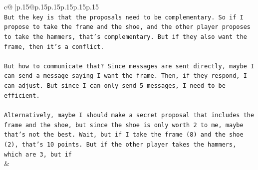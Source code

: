 \documentclass{article}
\begin{document}
{\begin{supertabular}{c@{$\;$}|p{.15\linewidth}@{}p{.15\linewidth}p{.15\linewidth}p{.15\linewidth}p{.15\linewidth}p{.15\linewidth}}
{{{\\ 
\texttt{But the key is that the proposals need to be complementary. So if I propose to take the frame and the shoe, and the other player proposes to take the hammers, that's complementary. But if they also want the frame, then it's a conflict.} \\
\\ 
\texttt{But how to communicate that? Since messages are sent directly, maybe I can send a message saying I want the frame. Then, if they respond, I can adjust. But since I can only send 5 messages, I need to be efficient.} \\
\\ 
\texttt{Alternatively, maybe I should make a secret proposal that includes the frame and the shoe, but since the shoe is only worth 2 to me, maybe that's not the best. Wait, but if I take the frame (8) and the shoe (2), that's 10 points. But if the other player takes the hammers, which are 3, but if} \\
            }
        }
    }
    & \\ \\


\end{supertabular}}
\end{document}
